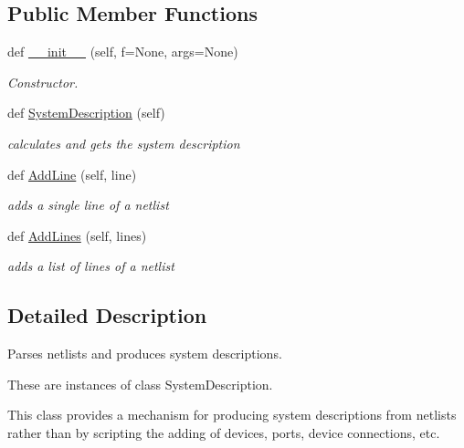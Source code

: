 \subsection*{Public Member Functions}
\begin{DoxyCompactItemize}
\item 
def \hyperlink{classSignalIntegrity_1_1Parsers_1_1SystemDescriptionParser_1_1SystemDescriptionParser_af9856388f7022892c3159ad55872a27e}{\+\_\+\+\_\+init\+\_\+\+\_\+} (self, f=None, args=None)
\begin{DoxyCompactList}\small\item\em Constructor. \end{DoxyCompactList}\item 
def \hyperlink{classSignalIntegrity_1_1Parsers_1_1SystemDescriptionParser_1_1SystemDescriptionParser_acfebed448a60c7903add117ba0d3c162}{System\+Description} (self)
\begin{DoxyCompactList}\small\item\em calculates and gets the system description \end{DoxyCompactList}\item 
def \hyperlink{classSignalIntegrity_1_1Parsers_1_1SystemDescriptionParser_1_1SystemDescriptionParser_ad23780a23a82282021fe6da488be6282}{Add\+Line} (self, line)
\begin{DoxyCompactList}\small\item\em adds a single line of a netlist \end{DoxyCompactList}\item 
def \hyperlink{classSignalIntegrity_1_1Parsers_1_1SystemDescriptionParser_1_1SystemDescriptionParser_a202f2c3cb7399e050dc334c004957fc4}{Add\+Lines} (self, lines)
\begin{DoxyCompactList}\small\item\em adds a list of lines of a netlist \end{DoxyCompactList}\end{DoxyCompactItemize}


\subsection{Detailed Description}
Parses netlists and produces system descriptions. 

These are instances of class System\+Description.

This class provides a mechanism for producing system descriptions from netlists rather than by scripting the adding of devices, ports, device connections, etc. 

